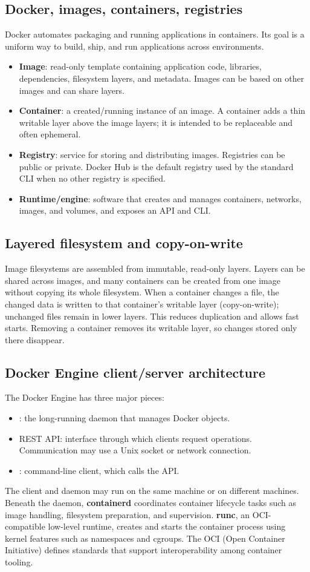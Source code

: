 \documentclass[11pt,a4paper]{article}
\newcommand{\cmd}[1]{\texttt{\detokenize{#1}}}
\newcommand{\term}[1]{\textbf{#1}}
\begin{document}
\subsection{Docker, images, containers, registries}
Docker automates packaging and running applications in containers. Its goal is a uniform way to build, ship, and run applications across environments.
\begin{itemize}
\item \term{Image}: read-only template containing application code, libraries, dependencies, filesystem layers, and metadata. Images can be based on other images and can share layers.
\item \term{Container}: a created/running instance of an image. A container adds a thin writable layer above the image layers; it is intended to be replaceable and often ephemeral.
\item \term{Registry}: service for storing and distributing images. Registries can be public or private. Docker Hub is the default registry used by the standard CLI when no other registry is specified.
\item \term{Runtime/engine}: software that creates and manages containers, networks, images, and volumes, and exposes an API and CLI.
\end{itemize}

\subsection{Layered filesystem and copy-on-write}
Image filesystems are assembled from immutable, read-only layers. Layers can be shared across images, and many containers can be created from one image without copying its whole filesystem. When a container changes a file, the changed data is written to that container's writable layer (copy-on-write); unchanged files remain in lower layers. This reduces duplication and allows fast starts. Removing a container removes its writable layer, so changes stored only there disappear.

\subsection{Docker Engine client/server architecture}
The Docker Engine has three major pieces:
\begin{itemize}
\item \cmd{dockerd}: the long-running daemon that manages Docker objects.
\item REST API: interface through which clients request operations. Communication may use a Unix socket or network connection.
\item \cmd{docker}: command-line client, which calls the API.
\end{itemize}
The client and daemon may run on the same machine or on different machines. Beneath the daemon, \term{containerd} coordinates container lifecycle tasks such as image handling, filesystem preparation, and supervision. \term{runc}, an OCI-compatible low-level runtime, creates and starts the container process using kernel features such as namespaces and cgroups. The OCI (Open Container Initiative) defines standards that support interoperability among container tooling.
\end{document}
